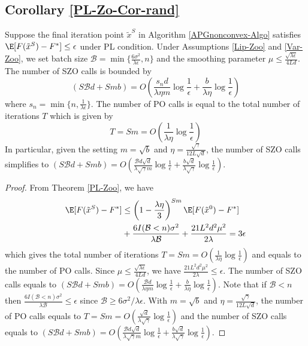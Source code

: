\noindent\subsection{Corollary \ref{PL-Zo-Cor-rand}}
\begin{corollary}\label{PL-Zo-Cor-rand}
Suppose the final iteration point $\tilde{x}^S$ in Algorithm \ref{APGnonconvex-Algo} satisfies $\E[F(\tilde{x}^S) - F^*]\leq \epsilon$ under PL condition. Under Assumptions \ref{Lip-Zoo} and \ref{Var-Zoo}, we set batch size $\mathcal{B} = \min\{\frac{6\sigma^2}{\lambda\epsilon},n\}$ and the smoothing parameter $\mu \leq \frac{\sqrt{\lambda\epsilon}}{4 L d}$. The number of SZO calls is bounded by
\[
(S\mathcal{B}d+Smb) = O(\frac{s_n d}{\lambda\eta m}\log\frac{1}{\epsilon}+\frac{b }{\lambda\eta}\log\frac{1}{\epsilon})
\]
where $s_n = \min \{n,\frac{1}{\lambda \epsilon}\}$.
The number of PO calls is equal to the total number of iterations $T$ which is given by
\[
T = Sm = O(\frac{1}{\lambda\eta}\log\frac{1}{\epsilon})
\]
In particular, given the setting  $m=\sqrt{b}$ and $\eta = \frac{\sqrt{\gamma}}{12 L\sqrt{d}}$, the number of SZO calls  simplifies to 
$(S\mathcal{B}d+Smb) = O(\frac{\mathcal{B}d\sqrt{d}}{\lambda\sqrt{\gamma} m}\log\frac{1}{\epsilon}+\frac{b\sqrt{d}}{\lambda\sqrt{\gamma}}\log\frac{1}{\epsilon})$.
\end{corollary}
\begin{proof}
From Theorem \ref{PL-Zoo}, we have
\begin{align}
\E[F(\tilde{x}^S) - {F}^*] & \leq   \left(1-\frac{\lambda\eta}{3}\right)^{Sm} \E[F(\tilde{x}^0) - {F}^*]\notag\\
& + \frac{6I(\mathcal{B} < n) \sigma ^2}{\lambda\mathcal{\mathcal{B}}}+\frac{21 L^2 d^2 \mu^2}{2\lambda}= 3 \epsilon
\end{align}
which gives the total number of iterations $T = Sm = O(\frac{1}{\lambda\eta}\log\frac{1}{\epsilon})$ and equals to the number of PO calls. Since $\mu \leq \frac{\sqrt{\lambda\epsilon}}{4 L d}$, we have $\frac{21 L^2 d^2 \mu^2}{2\lambda} \leq \epsilon$. The number of SZO calls equals to $(S\mathcal{B}d+Smb) = O(\frac{\mathcal{B}d}{\lambda\eta m}\log\frac{1}{\epsilon}+\frac{b}{\lambda\eta}\log\frac{1}{\epsilon})$.  Note that if $\mathcal{B} < n$ then $\frac{6I(\mathcal{B} < n) \sigma ^2}{\lambda\mathcal{B}} \leq \epsilon$ since $\mathcal{B} \geq 6 {\sigma ^2}/{\lambda \epsilon}$. With $m=\sqrt{b}$ and $\eta = \frac{\sqrt{\gamma}}{12 L\sqrt{d}}$, the number of PO calls equals to $T = Sm = O(\frac{\sqrt{d}}{\lambda\sqrt{\gamma}}\log\frac{1}{\epsilon})$ and the number of SZO calls equals to $(S\mathcal{B}d+Smb) = O(\frac{\mathcal{B}d\sqrt{d}}{\lambda\sqrt{\gamma} m}\log\frac{1}{\epsilon}+\frac{b\sqrt{d}}{\lambda\sqrt{\gamma}}\log\frac{1}{\epsilon})$.
\end{proof}
